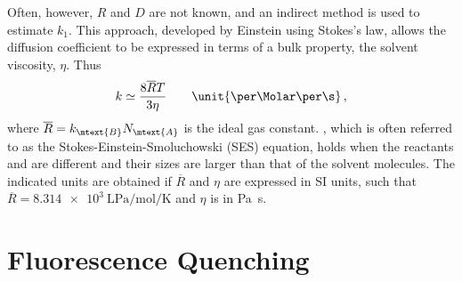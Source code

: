Often, however, \( R \) and \( D \) are not known, and an indirect method is used to estimate \( k_1 \). 
This approach, developed by Einstein using Stokes's law, allows the diffusion coefficient to be expressed in terms of a bulk property, the solvent viscosity, \( \eta \). Thus
\begin{equation}
	k \simeq \frac{8 \overline{R} T}{3 \eta} \qquad \unit{\per\Molar \per \s} \, ,
	\label{eq:rateapprox}
\end{equation}
where \( \overline{R} = k_\mtext{B} N_\mtext{A} \) is the ideal gas constant.%
, which is often referred to as the Stokes-Einstein-Smoluchowski (SES) equation, holds when the reactants  and  are different and their sizes are larger than that of the solvent molecules. 
The indicated units are obtained if \( \overline{R} \) and \( \eta \) are expressed in SI units, such that \( \overline{R} = \qty{8.314e3}{\L \Pa \per \mol \per \K} \) and \( \eta \) is in \unit[inter-unit-product=\ensuremath{{}\!\cdot\!{}}]{\Pa \s}.

\section{Fluorescence Quenching} %
\label{sec:fl_quenching}

